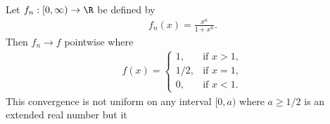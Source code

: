 \documentclass{article}
\begin{document}
\begin{claim*}
   Let $f_n:[0,\infty)\to\R$ be defined by 
   \begin{align*}
      f_n(x) = \frac{x^n}{1+x^n}.
   \end{align*}
   Then $f_n\to f$ pointwise where 
   \begin{align*}
      f(x) = \begin{cases}
         1, &\text{if }x > 1,\\
         1/2, &\text{if }x = 1, \\
         0, &\text{if }x < 1.
      \end{cases}
   \end{align*}
   This convergence is not uniform on any interval $[0, a)$ where
   $a\geq 1/2$ is an extended real number but it 
\end{claim*}
\end{document}
